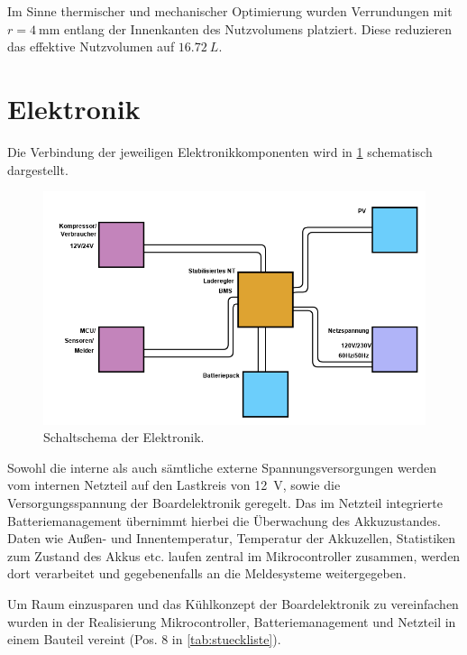 		Im Sinne thermischer und mechanischer Optimierung wurden Verrundungen mit \(r=\SI{4}{\mm}\) entlang der Innenkanten des Nutzvolumens platziert. Diese reduzieren das
		effektive Nutzvolumen auf $ \SI{16,72}{L} $.
		
	\section{Elektronik}
		Die Verbindung der jeweiligen Elektronikkomponenten wird in \cref{fig:schaltschema} schematisch dargestellt.
		
		\begin{figure}[H]
			\centering
			\includegraphics[width=1\linewidth]{assets/skizzen/Schaltschema}
			\caption{Schaltschema der Elektronik.}
			\label{fig:schaltschema}
		\end{figure}

		Sowohl die interne als auch sämtliche externe Spannungsversorgungen werden vom internen Netzteil auf den Lastkreis von \SI{12}{V}, sowie die Versorgungsspannung der Boardelektronik
		geregelt. Das im Netzteil integrierte Batteriemanagement übernimmt hierbei die Überwachung des Akkuzustandes. Daten wie Außen- und Innentemperatur, Temperatur der Akkuzellen,
		Statistiken zum Zustand des Akkus etc. laufen zentral im Mikrocontroller zusammen, werden dort verarbeitet und gegebenenfalls an die Meldesysteme weitergegeben.

		Um Raum einzusparen und das Kühlkonzept der Boardelektronik zu vereinfachen wurden in der Realisierung Mikrocontroller, Batteriemanagement und Netzteil in einem Bauteil vereint
		(Pos. 8 in \cref{tab:stueckliste}).